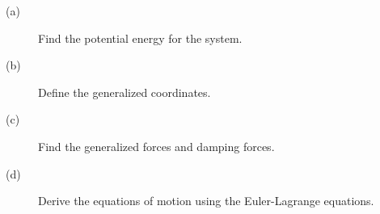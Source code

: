 \begin{description}\item[]
    \item[(a)] Find the potential energy for the system.
    \item[(b)] Define the generalized coordinates.
    \item[(c)] Find the generalized forces and damping forces.
    \item[(d)] Derive the equations of motion using the Euler-Lagrange equations.
\end{description}
